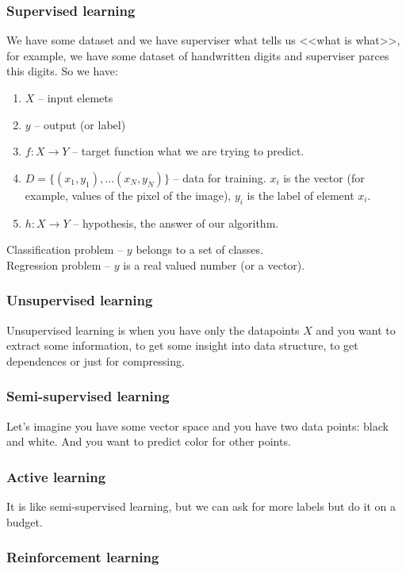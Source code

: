 \subsubsection*{Supervised learning}

We have some dataset and we have superviser what tells us <<what is what>>, for example, we have some dataset of handwritten digits and superviser parces this digits. So we have:
\begin{enumerate}[label=$\bullet$]
	\item $X$ -- input elemets
	\item $y$ -- output (or label)
	\item $f\colon X\to Y$ -- target function what we are trying to predict.
	\item $D=\{(x_1,y_1),\ldots(x_N,y_N)\}$ -- data for training. $x_i$ is the vector (for example, values of the pixel of the image), $y_i$ is the label of element $x_i$.
	\item $h\colon X\to Y$ -- hypothesis, the answer of our algorithm.
\end{enumerate}
Classification problem -- $y$ belongs to a set of classes.\\
Regression problem -- $y$ is a real valued number (or a vector).

\subsubsection*{Unsupervised learning}

Unsupervised learning is when you have only the datapoints $X$ and you want to extract some information, to get some insight into data structure, to get dependences or just for compressing. 

\subsubsection*{Semi-supervised learning}

Let's imagine you have some vector space and you have two data points: black and white. And you want to predict color for other points.

\subsubsection*{Active learning}

It is like semi-supervised learning, but we can ask for more labels but do it on a budget.

\subsubsection*{Reinforcement learning}

